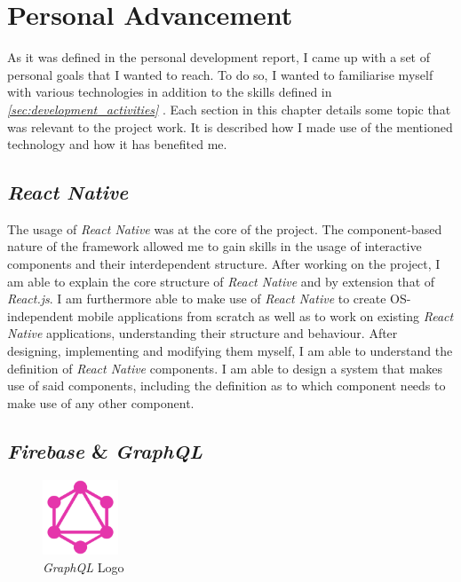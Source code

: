 \section{Personal Advancement}
\label{sec:personal_advancement}

As it was defined in the personal development report, I came up with a set of personal goals that I wanted to reach. To do so, I wanted to familiarise myself with various technologies in addition to the skills defined in \textit{\ref{sec:development_activities} }.
\newline
Each section in this chapter details some topic that was relevant to the project work. It is described how I made use of the mentioned technology and how it has benefited me.

\subsection{\textit{React Native}}
\label{ssec:react_native}

The usage of \textit{React Native} was at the core of the project. The component-based nature of the framework allowed me to gain skills in the usage of interactive components and their interdependent structure. After working on the project, I am able to explain the core structure of \textit{React Native} and by extension that of \textit{React.js}. I am furthermore able to make use of \textit{React Native} to create OS-independent mobile applications from scratch as well as to work on existing \textit{React Native} applications, understanding their structure and behaviour.
\newline
After designing, implementing and modifying them myself, I am able to understand the definition of \textit{React Native} components. I am able to design a system that makes use of said components, including the definition as to which component needs to make use of any other component.

\subsection{\textit{Firebase} \& \textit{GraphQL}}
\label{ssec:firebase_graphql}

\begin{figure}[H]
    \centering
    \includegraphics[width=0.2\textwidth]{images/graphql-logo.png}
    \caption{\textit{GraphQL} Logo}
    \label{fig:graphql_logo}
\end{figure}


